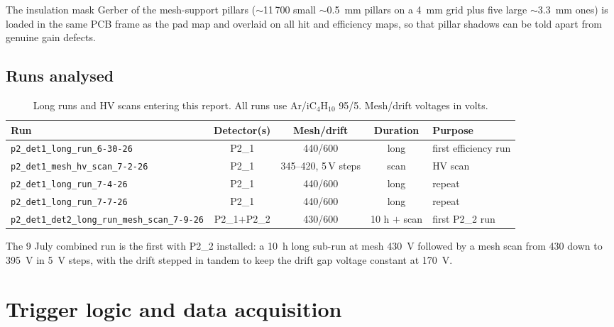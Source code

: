 \documentclass[11pt,a4paper]{article}
\newcommand{\detone}{P2\_1}
\newcommand{\dettwo}{P2\_2}
\newcommand{\code}[1]{\texttt{#1}}
\begin{document}
The insulation mask Gerber of the mesh-support pillars
($\sim$11\,700 small $\sim$\SI{0.5}{mm} pillars on a \SI{4}{mm} grid plus five
large $\sim$\SI{3.3}{mm} ones) is loaded in the same PCB frame as the pad map
and overlaid on all hit and efficiency maps, so that pillar shadows can be told
apart from genuine gain defects.

\subsection{Runs analysed}

\begin{table}[htb]
  \centering
  \caption{Long runs and HV scans entering this report. All runs use
  Ar/iC$_4$H$_{10}$ 95/5. Mesh/drift voltages in volts.}
  \label{tab:runs}
  \footnotesize
  \setlength{\tabcolsep}{3pt}
  \begin{tabular}{lcccl}
    \toprule
    Run & Detector(s) & Mesh/drift & Duration & Purpose \\
    \midrule
    \code{p2\_det1\_long\_run\_6-30-26} & \detone{} & 440/600 & long & first efficiency run \\
    \code{p2\_det1\_mesh\_hv\_scan\_7-2-26} & \detone{} & 345--420, 5\,V steps & scan & HV scan \\
    \code{p2\_det1\_long\_run\_7-4-26} & \detone{} & 440/600 & long & repeat \\
    \code{p2\_det1\_long\_run\_7-7-26} & \detone{} & 440/600 & long & repeat \\
    \code{p2\_det1\_det2\_long\_run\_mesh\_scan\_7-9-26} & \detone{}$+$\dettwo{} & 430/600 & 10 h $+$ scan & first \dettwo{} run \\
    \bottomrule
  \end{tabular}
\end{table}

The 9 July combined run is the first with \dettwo{} installed: a \SI{10}{h}
long sub-run at mesh \SI{430}{V} followed by a mesh scan from 430 down to
\SI{395}{V} in \SI{5}{V} steps, with the drift stepped in tandem to keep the
drift gap voltage constant at \SI{170}{V}.

\section{Trigger logic and data acquisition}
\label{sec:trigger}
\end{document}
